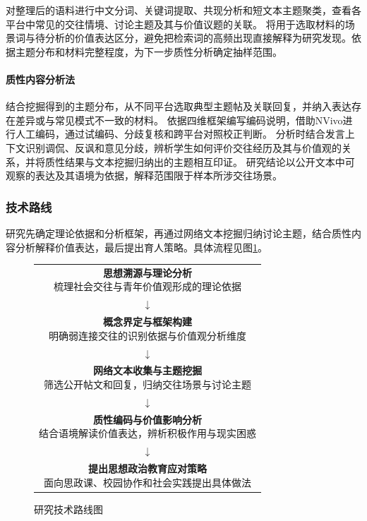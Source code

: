 对整理后的语料进行中文分词、关键词提取、共现分析和短文本主题聚类，查看各平台中常见的交往情境、讨论主题及其与价值议题的关联。
将用于选取材料的场景词与待分析的价值表达区分，避免把检索词的高频出现直接解释为研究发现。依据主题分布和材料完整程度，为下一步质性分析确定抽样范围。

\paragraph{质性内容分析法}
结合挖掘得到的主题分布，从不同平台选取典型主题帖及关联回复，并纳入表达存在差异或与常见模式不一致的材料。
依据四维框架编写编码说明，借助NVivo进行人工编码，通过试编码、分歧复核和跨平台对照校正判断。
分析时结合发言上下文识别调侃、反讽和意见分歧，辨析学生如何评价交往经历及其与价值观的关系，并将质性结果与文本挖掘归纳出的主题相互印证。
研究结论以公开文本中可观察的表达及其语境为依据，解释范围限于样本所涉交往场景。

\subsubsection{技术路线}

研究先确定理论依据和分析框架，再通过网络文本挖掘归纳讨论主题，结合质性内容分析解释价值表达，最后提出育人策略。具体流程见图\ref{fig:research-roadmap}。

\begin{figure}[htbp]
  \centering
  \small
  \renewcommand{\thefigure}{\arabic{figure}}
  \setlength{\fboxsep}{5pt}
  \begin{tabular}{@{}c@{}}
    \fbox{\parbox{0.8\linewidth}{\centering\textbf{思想溯源与理论分析}\\梳理社会交往与青年价值观形成的理论依据}} \\
    \(\downarrow\) \\
    \fbox{\parbox{0.8\linewidth}{\centering\textbf{概念界定与框架构建}\\明确弱连接交往的识别依据与价值观分析维度}} \\
    \(\downarrow\) \\
    \fbox{\parbox{0.8\linewidth}{\centering\textbf{网络文本收集与主题挖掘}\\筛选公开帖文和回复，归纳交往场景与讨论主题}} \\
    \(\downarrow\) \\
    \fbox{\parbox{0.8\linewidth}{\centering\textbf{质性编码与价值影响分析}\\结合语境解读价值表达，辨析积极作用与现实困惑}} \\
    \(\downarrow\) \\
    \fbox{\parbox{0.8\linewidth}{\centering\textbf{提出思想政治教育应对策略}\\面向思政课、校园协作和社会实践提出具体做法}}
  \end{tabular}
  \caption{研究技术路线图}
  \label{fig:research-roadmap}
\end{figure}

